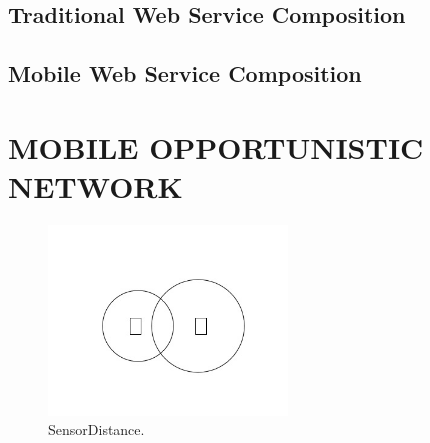 \documentclass[10pt,journal,compsoc]{IEEEtran}
\begin{document}
\subsection{Traditional Web Service Composition}
\subsection{Mobile Web Service Composition}


\section{MOBILE OPPORTUNISTIC NETWORK}

\begin{figure}[!t]
\centering
\includegraphics[width=2.5in]{./img/sensorDistance.jpg}
\caption{SensorDistance.}
\label{fig_sim}
\end{figure}
\end{document}

